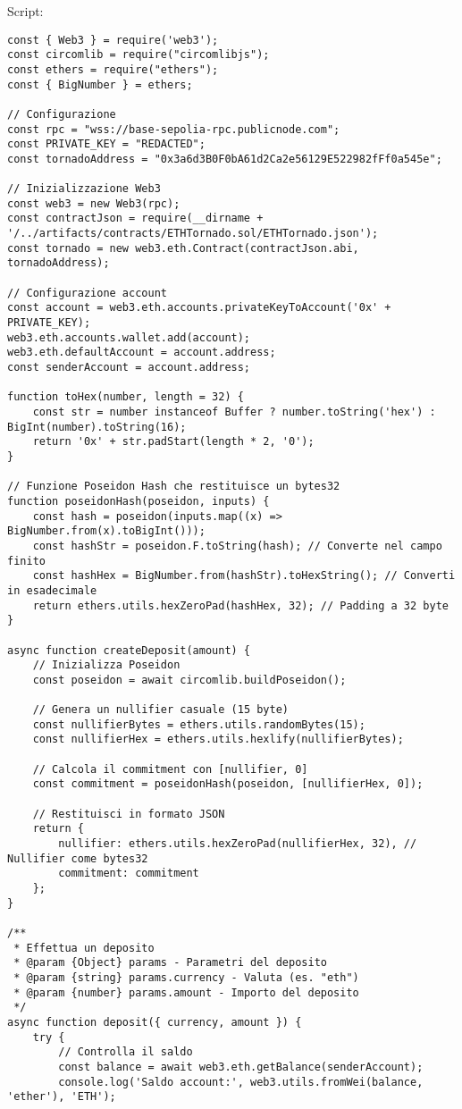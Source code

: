 Script:

\begin{lstlisting}
const { Web3 } = require('web3');
const circomlib = require("circomlibjs");
const ethers = require("ethers");
const { BigNumber } = ethers;

// Configurazione
const rpc = "wss://base-sepolia-rpc.publicnode.com";
const PRIVATE_KEY = "REDACTED";
const tornadoAddress = "0x3a6d3B0F0bA61d2Ca2e56129E522982fFf0a545e";

// Inizializzazione Web3
const web3 = new Web3(rpc);
const contractJson = require(__dirname + '/../artifacts/contracts/ETHTornado.sol/ETHTornado.json');
const tornado = new web3.eth.Contract(contractJson.abi, tornadoAddress);

// Configurazione account
const account = web3.eth.accounts.privateKeyToAccount('0x' + PRIVATE_KEY);
web3.eth.accounts.wallet.add(account);
web3.eth.defaultAccount = account.address;
const senderAccount = account.address;

function toHex(number, length = 32) {
    const str = number instanceof Buffer ? number.toString('hex') : BigInt(number).toString(16);
    return '0x' + str.padStart(length * 2, '0');
}

// Funzione Poseidon Hash che restituisce un bytes32
function poseidonHash(poseidon, inputs) {
    const hash = poseidon(inputs.map((x) => BigNumber.from(x).toBigInt()));
    const hashStr = poseidon.F.toString(hash); // Converte nel campo finito
    const hashHex = BigNumber.from(hashStr).toHexString(); // Converti in esadecimale
    return ethers.utils.hexZeroPad(hashHex, 32); // Padding a 32 byte
}

async function createDeposit(amount) {
    // Inizializza Poseidon
    const poseidon = await circomlib.buildPoseidon();

    // Genera un nullifier casuale (15 byte)
    const nullifierBytes = ethers.utils.randomBytes(15);
    const nullifierHex = ethers.utils.hexlify(nullifierBytes);

    // Calcola il commitment con [nullifier, 0]
    const commitment = poseidonHash(poseidon, [nullifierHex, 0]);

    // Restituisci in formato JSON
    return {
        nullifier: ethers.utils.hexZeroPad(nullifierHex, 32), // Nullifier come bytes32
        commitment: commitment
    };
}

/**
 * Effettua un deposito
 * @param {Object} params - Parametri del deposito
 * @param {string} params.currency - Valuta (es. "eth")
 * @param {number} params.amount - Importo del deposito
 */
async function deposit({ currency, amount }) {
    try {
        // Controlla il saldo
        const balance = await web3.eth.getBalance(senderAccount);
        console.log('Saldo account:', web3.utils.fromWei(balance, 'ether'), 'ETH');


\end{lstlisting}
